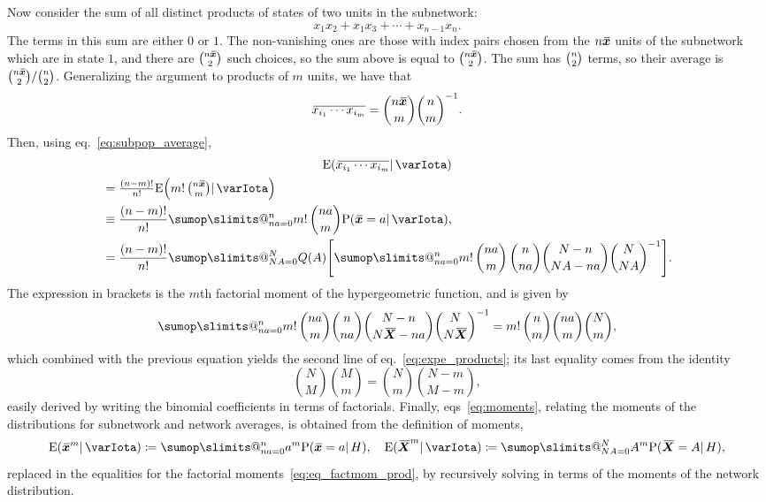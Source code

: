 \documentclass{article}
\makeatletter
\theoremstyle{remark}
\theoremstyle{innote}
\def\sum{\DOTSI\sumop\slimits@}
\newcommand*{\citep}{\parencites}
\newcommand*{\defd}{\coloneqq}
\renewcommand*{\|}{\mathpunct{|}}%
\newcommand*{\p}{\mathrm{P}}%
\newcommand*{\eqn}{eq.}%
\newcommand*{\eqns}{eqs}%
\newcommand*{\E}{\mathrm{E}}
\DeclarePairedDelimiter\expp{(}{)}
\newcommand*{\expe}{\E\expp}%
\theoremstyle{simple}
\newcommand*{\widebar}[1]{{\mkern1.5mu\skew{2}\overline{\mkern-1.5mu#1\mkern-1.5mu}\mkern 1.5mu}}
\newcommand*{\av}{\widebar} %
\newcommand*{\sav}{\widebar} %
\newcommand*{\yxx}{x}%
\newcommand*{\yx}{\bm{\yxx}}%
\newcommand*{\yxs}{\sav{\yx}}%
\newcommand*{\yX}{\bm{X}}%
\newcommand*{\yXf}{\av{\yX}}%
\newcommand*{\yH}{\varIota}
\makeatother
\begin{document}
  Now consider the sum of all distinct products of states of two units in
  the subnetwork:
  \begin{equation*}
    x_1 x_2 + x_1 x_3 + \dotsb + x_{n-1} x_n.
  \end{equation*}
  The terms in this sum are either $0$ or $1$. The non-vanishing ones are
  those with index pairs chosen from the $n\yxs$ units of the subnetwork
  which are in state $1$, and there are $\tbinom{n\yxs}{2}$ such choices,
  so the sum above is equal to $\tbinom{n\yxs}{2}$. The sum has
  $\tbinom{n}{2}$ terms, so their average is
  $\tbinom{n\yxs}{2}/\tbinom{n}{2}$. Generalizing the argument to products
  of $m$ units, we have that
  \begin{equation}
    \sav{x_{i_1} \dotsm x_{i_m}} = \binom{n\yxs}{m} \binom{n}{m}^{-1}.
  \end{equation}
  Then, using \eqn~\eqref{eq:subpop_average},
  \begin{multline}
    \label{eq:expect_product_m}
    \expe*{\sav{x_{i_1} \dotsm x_{i_m}} \| \yH}
    \\
    \begin{aligned}[b]
      &=\tfrac{(n-m)!}{n!}
      \expe*{m!\,\tbinom{n\yxs}{m}  \| \yH}
      \\
      &\equiv\frac{(n-m)!}{n!}
      \sum_{n a=0}^n m!\, \binom{n a}{m} \p(\yxs =a \|\yH),
      \\
      &=\frac{(n-m)!}{n!} \sum_{N A=0}^N
      Q( A)
      \Biggl[ 
      \sum_{n a=0}^n 
      m!\,\binom{n a}{m}\, \binom{n}{n a}\binom{N-n}{N A-n a}\binom{N}{N A}^{-1} 
      \Biggr].
    \end{aligned}
  \end{multline}
  The expression in brackets is the $m$th factorial moment of the
  hypergeometric function, and is given by \citep{potts1953}
  \begin{equation}
    \sum_{n a=0}^n m!\,\binom{n a}{m} \binom{n}{n a}\binom{N-n}{N\yXf-n a}
    \binom{N}{N\yXf}^{-1} 
    =
    m!\,\binom{n}{m} \binom{n a}{m}\binom{N}{m},
  \end{equation}
  which combined with the previous equation yields the second line of
  \eqn~\eqref{eq:expe_products}; its last equality comes from the identity
  \begin{equation}
    \label{eq:binom_identity}
    \binom{N}{M}\binom{M}{m}=\binom{N}{m}\binom{N-m}{M-m},
  \end{equation}
  easily derived by writing the binomial coefficients in terms of
  factorials. Finally, \eqns~\eqref{eq:moments}, relating the moments of
  the distributions for subnetwork and network averages, is obtained
  from the definition of moments,
  \begin{equation}
    \label{eq:moments_def}
    \expe*{\yxs^m \| \yH} \defd
    \sum_{n a=0}^{n} a^m \p(\yxs = a  \| H),
    \quad
    \expe{\yXf^m \| \yH} \defd
    \sum_{N A=0}^{N} A^m \p(\yXf = A  \| H),
  \end{equation}
  replaced in the equalities for the factorial
  moments~\eqref{eq:eq_factmom_prod}, by recursively solving in terms of
  the moments of the network distribution.
\end{document}
